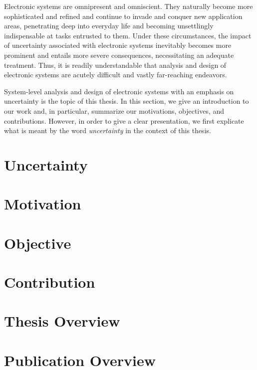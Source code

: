Electronic systems are omnipresent and omniscient. They naturally become more
sophisticated and refined and continue to invade and conquer new application
areas, penetrating deep into everyday life and becoming unsettlingly
indispensable at tasks entrusted to them. Under these circumstances, the impact
of uncertainty associated with electronic systems inevitably becomes more
prominent and entails more severe consequences, necessitating an adequate
treatment. Thus, it is readily understandable that analysis and design of
electronic systems are acutely difficult and vastly far-reaching endeavors.

System-level analysis and design of electronic systems with an emphasis on
uncertainty is the topic of this thesis. In this section, we give an
introduction to our work and, in particular, summarize our motivations,
objectives, and contributions. However, in order to give a clear presentation,
we first explicate what is meant by the word \emph{uncertainty} in the context
of this thesis.

\section{Uncertainty}

\section{Motivation}

\section{Objective}

\section{Contribution}

\section{\pasttitle}

\section{Thesis Overview}

\section{Publication Overview}
